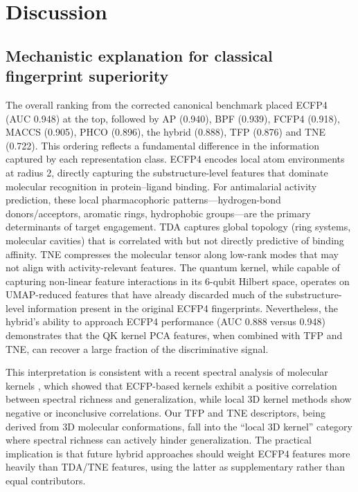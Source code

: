 \documentclass[11pt,a4paper]{article}
\begin{document}

\section{Discussion}



\subsection{Mechanistic explanation for classical fingerprint superiority}


The overall ranking from the corrected canonical benchmark placed ECFP4 (AUC \num{0.948}) at the top, followed by AP (\num{0.940}), BPF (\num{0.939}), FCFP4 (\num{0.918}), MACCS (\num{0.905}), PHCO (\num{0.896}), the hybrid (\num{0.888}), TFP (\num{0.876}) and TNE (\num{0.722}). This ordering reflects a fundamental difference in the information captured by each representation class. ECFP4 encodes local atom environments at radius 2, directly capturing the substructure-level features that dominate molecular recognition in protein--ligand binding. For antimalarial activity prediction, these local pharmacophoric patterns---hydrogen-bond donors/acceptors, aromatic rings, hydrophobic groups---are the primary determinants of target engagement. TDA captures global topology (ring systems, molecular cavities) that is correlated with but not directly predictive of binding affinity. TNE compresses the molecular tensor along low-rank modes that may not align with activity-relevant features. The quantum kernel, while capable of capturing non-linear feature interactions in its 6-qubit Hilbert space, operates on UMAP-reduced features that have already discarded much of the substructure-level information present in the original ECFP4 fingerprints. Nevertheless, the hybrid's ability to approach ECFP4 performance (AUC \num{0.888} versus \num{0.948}) demonstrates that the QK kernel PCA features, when combined with TFP and TNE, can recover a large fraction of the discriminative signal.

This interpretation is consistent with a recent spectral analysis of molecular kernels \citep{jamali2025spectral}, which showed that ECFP-based kernels exhibit a positive correlation between spectral richness and generalization, while local 3D kernel methods show negative or inconclusive correlations. Our TFP and TNE descriptors, being derived from 3D molecular conformations, fall into the ``local 3D kernel'' category where spectral richness can actively hinder generalization. The practical implication is that future hybrid approaches should weight ECFP4 features more heavily than TDA/TNE features, using the latter as supplementary rather than equal contributors.
\end{document}
